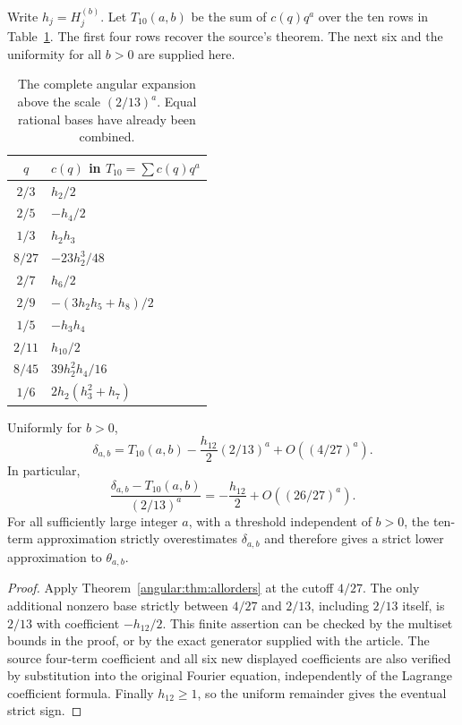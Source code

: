 Write $h_j=H_j^{(b)}$. Let $T_{10}(a,b)$ be the sum of $c(q)q^a$
over the ten rows in Table~\ref{angular:tab:ten}. The first four rows
recover the source's theorem. The next six and the uniformity for
all $b>0$ are supplied here.

\begin{table}[ht]
\centering
\caption{The complete angular expansion above the scale $(2/13)^a$.
Equal rational bases have already been combined.}
\label{angular:tab:ten}
\begin{tabular}{@{}cl@{}}
\toprule
$q$& $c(q)$ in $T_{10}=\sum c(q)q^a$\\
\midrule
$2/3$ & $h_2/2$\\
$2/5$ & $-h_4/2$\\
$1/3$ & $h_2h_3$\\
$8/27$ & $-23h_2^3/48$\\
$2/7$ & $h_6/2$\\
$2/9$ & $-(3h_2h_5+h_8)/2$\\
$1/5$ & $-h_3h_4$\\
$2/11$ & $h_{10}/2$\\
$8/45$ & $39h_2^2h_4/16$\\
$1/6$ & $2h_2(h_3^2+h_7)$\\
\bottomrule
\end{tabular}
\end{table}

\begin{corollary}
\label{angular:cor:ten}
Uniformly for $b>0$,
\begin{equation}\label{angular:eq:eleven}
 \delta_{a,b}=T_{10}(a,b)-\frac{h_{12}}2(2/13)^a
       +O((4/27)^a).
\end{equation}
In particular,
\[
 \frac{\delta_{a,b}-T_{10}(a,b)}{(2/13)^a}
   =-\frac{h_{12}}2+O((26/27)^a).
\]
For all sufficiently large integer $a$, with a threshold independent
of $b>0$, the ten-term approximation strictly overestimates
$\delta_{a,b}$ and therefore gives a strict lower approximation to
$\theta_{a,b}$.
\end{corollary}

\begin{proof}
Apply Theorem~\ref{angular:thm:allorders} at the cutoff $4/27$.
The only additional nonzero base strictly between $4/27$ and
$2/13$, including $2/13$ itself, is $2/13$ with coefficient
$-h_{12}/2$.  This finite assertion can be checked by the multiset
bounds in the proof, or by the exact generator supplied with the
article.  The source four-term coefficient and all six new displayed
coefficients are also verified by substitution into the original
Fourier equation, independently of the Lagrange coefficient formula.
Finally $h_{12}\geq1$, so the uniform remainder gives the eventual
strict sign.
\end{proof}

